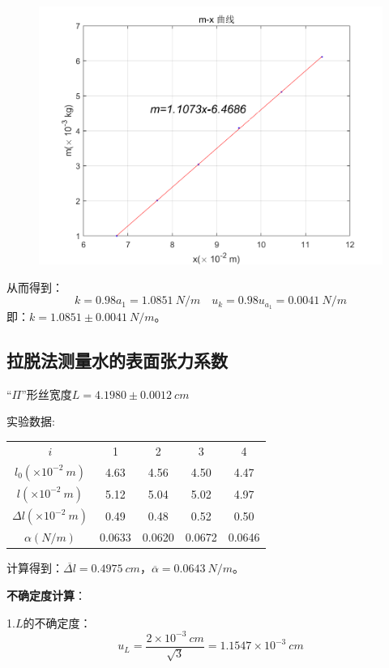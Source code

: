 \documentclass{article}
\begin{document}
\begin{figure}[!ht]
    \centering
    \includegraphics[width=13cm]{2.png}
\end{figure}

从而得到：
$$
    k=0.98a_1=1.0851\ N/m \quad u_k=0.98u_{a_1}=0.0041\ N/m
$$
即：$k=1.0851\pm 0.0041\ N/m$。

\subsection{拉脱法测量水的表面张力系数}
“$\Pi$”形丝宽度$L=4.1980\pm 0.0012\ cm$

实验数据:
\begin{table}[!ht]
    \centering
    \begin{tabular}{ccccc}
    \hline\hline
    $i$& 1 & 2 & 3 & 4 \\
    $l_0(\times 10^{-2}\ m)$&4.63&4.56&4.50&4.47\\
    $l(\times 10^{-2}\ m)$ &5.12&5.04&5.02&4.97\\
    $\Delta l(\times 10^{-2}\ m)$& 0.49&0.48&0.52&0.50\\
    $\alpha(N/m)$&0.0633&0.0620&0.0672&0.0646\\
    \hline\hline
    \end{tabular}
\end{table}

计算得到：$\overline{\Delta l}=0.4975\ cm$，$\overline{\alpha}=0.0643\ N/m$。

\textbf{不确定度计算}：

1.$L$的不确定度：
$$
u_L=\frac{2\times 10^{-3}\ cm}{\sqrt{3}}=1.1547\times 10^{-3}\ cm
$$
\end{document}
